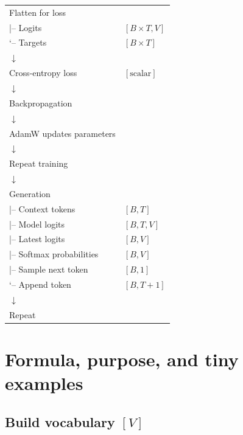 \begin{longtable}{@{}p{}@{}l@{}}
Flatten for loss & \\
\hspace*{2em}|-- Logits & \([B\mathbin{\times}T,V]\) \\
\hspace*{2em}`-- Targets & \([B\mathbin{\times}T]\) \\
\hspace*{2em}\(\downarrow\) & \\
Cross-entropy loss & \([\text{scalar}]\) \\
\hspace*{2em}\(\downarrow\) & \\
Backpropagation & \\
\hspace*{2em}\(\downarrow\) & \\
AdamW updates parameters & \\
\hspace*{2em}\(\downarrow\) & \\
Repeat training & \\
\hspace*{2em}\(\downarrow\) & \\
Generation & \\
\hspace*{2em}|-- Context tokens & \([B,T]\) \\
\hspace*{2em}|-- Model logits & \([B,T,V]\) \\
\hspace*{2em}|-- Latest logits & \([B,V]\) \\
\hspace*{2em}|-- Softmax probabilities & \([B,V]\) \\
\hspace*{2em}|-- Sample next token & \([B,1]\) \\
\hspace*{2em}`-- Append token & \([B,T+1]\) \\
\hspace*{2em}\(\downarrow\) & \\
Repeat &
\end{longtable}
\endgroup

\clearpage
\section{Formula, purpose, and tiny examples}

\subsection{Build vocabulary \( [V] \)}

